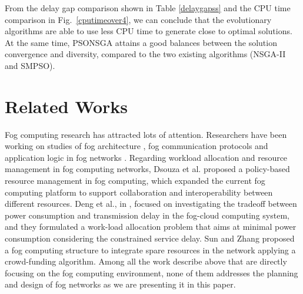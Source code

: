 \documentclass[10pt,journal,compsoc]{IEEEtran}
\newcommand{\Fig}[1]{Fig.~\ref{#1}}
\begin{document}
From the delay gap comparison shown in Table \ref{delaygapss} and the CPU time comparison in \Fig{cputimeover4}, we can conclude that the evolutionary algorithms are able to use less CPU time to generate close to optimal solutions. At the same time, PSONSGA attains a good balances between the solution convergence and diversity, compared to the two existing algorithms (NSGA-II and SMPSO).









\section{Related Works}\label{relwork}
Fog computing research has attracted lots of attention. Researchers have been working on studies of fog architecture \cite{fcsmartcity}, fog communication protocols \cite{Peng:2016:FRA:3029494.3029575} and application logic in fog networks \cite{SUN2017687}. Regarding workload allocation and resource management in fog computing networks, Dsouza et al.\cite{secme} proposed a policy-based resource management in fog computing, which expanded the current fog computing platform to support collaboration and interoperability between different resources. Deng et al., in \cite{fcworkload}, focused on investigating the tradeoff between power consumption and transmission delay in the fog-cloud computing system, and they formulated a work-load allocation problem that aims at minimal power consumption considering the constrained service delay. Sun and Zhang \cite{SUN2017687} proposed a fog computing structure to integrate spare resources in the network applying a crowd-funding algorithm.
Among all the work describe above that are directly focusing on the fog computing environment, none of them addresses the planning and design of fog networks as we are presenting it in this paper. 
\end{document}
